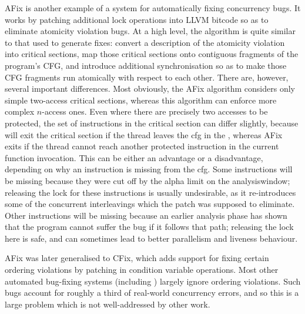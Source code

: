 AFix\cite{Jin2011} is another example of a system for automatically
fixing concurrency bugs.  It works by patching additional lock
operations into LLVM bitcode so as to eliminate atomicity violation
bugs.  At a high level, the algorithm is quite similar to that used to
generate {\technique} fixes: convert a description of the atomicity
violation into critical sections, map those critical sections onto
contiguous fragments of the program's CFG, and introduce additional
synchronisation so as to make those CFG fragments run atomically with
respect to each other.  There are, however, several important
differences.  Most obviously, the AFix algorithm considers only simple
two-access critical sections, whereas this algorithm can enforce more
complex $n$-access ones.  Even where there are precisely two accesses
to be protected, the set of instructions in the critical section can
differ slightly, because {\technique} will exit the critical section
if the thread leaves the \gls{cfg} in the {\StateMachine}, whereas
AFix exits if the thread cannot reach another protected instruction in
the current function invocation.  This can be either an advantage or a
disadvantage, depending on why an instruction is missing from the
{\StateMachine} \gls{cfg}.  Some instructions will be missing because
they were cut off by the \gls{alpha} limit on the
\gls{analysiswindow}; releasing the lock for these instructions is
usually undesirable, as it re-introduces some of the concurrent
interleavings which the patch was supposed to eliminate.  Other
instructions will be missing because an earlier analysis phase has
shown that the program cannot suffer the bug if it follows that path;
releasing the lock here is safe, and can sometimes lead to better
parallelism and liveness behaviour.

AFix was later generalised to CFix\cite{Jin2012}, which adds support
for fixing certain ordering violations by patching in condition
variable operations.  Most other automated bug-fixing systems
(including {\technique}) largely ignore ordering violations.  Such
bugs account for roughly a third of real-world concurrency
errors\cite{Lu2008}, and so this is a large problem which is not
well-addressed by other work.  

